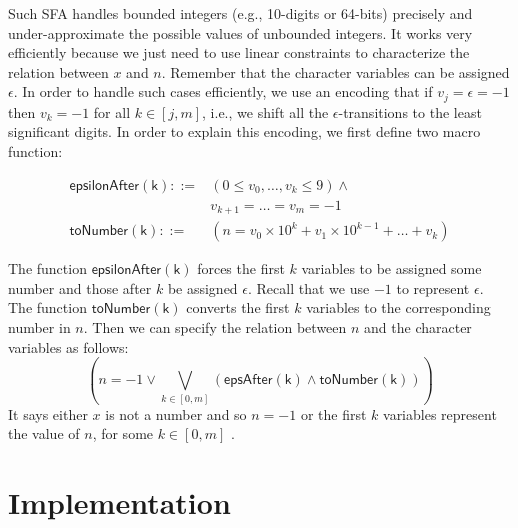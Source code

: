 \documentclass[sigplan,review,anonymous]{acmart}\settopmatter{printfolios=true,printccs=false,printacmref=false}
\begin{document}
Such SFA handles bounded integers (e.g., 10-digits or 64-bits) precisely and under-approximate the possible values of unbounded integers. It works very efficiently because we just need to use linear constraints to characterize the relation between $x$ and $n$. 
Remember that the character variables can be assigned $\epsilon$. In order to handle such cases efficiently, we use an encoding that if $v_j = \epsilon = -1$ then $v_k = -1$ for all $k\in [j,m]$, i.e., we shift all the $\epsilon$-transitions to the least significant digits. In order to explain this encoding, we first define two macro function:

$$\begin{array}{rl}
\mathsf{epsilonAfter(k)}::=& (0\leq v_0,\ldots, v_k\leq 9) \wedge\\
&v_{k+1}=\ldots =v_m = -1\\
\mathsf{toNumber(k)}::=& (n = v_0\times 10^{k} + v_1\times 10^{k-1} + \ldots + v_{k})
\end{array}
$$

The function $\mathsf{epsilonAfter(k)}$ forces the first $k$ variables to be assigned some number and those after $k$ be assigned $\epsilon$. Recall that we use $-1$ to represent $\epsilon$. The function $\mathsf{toNumber(k)}$ converts the first $k$ variables to the corresponding number in $n$.
Then we can specify the relation between $n$ and the character variables as follows:
$$(n=-1 \vee \bigvee_{k\in [0,m]} (\mathsf{epsAfter(k)} \wedge \mathsf{toNumber(k)} ) )$$
It says either $x$ is not a number and so $n=-1$ or the first $k$ variables represent the value of $n$, for some $k\in [0,m]$ .





\section{Implementation}\label{section:implementation}




\end{document}
